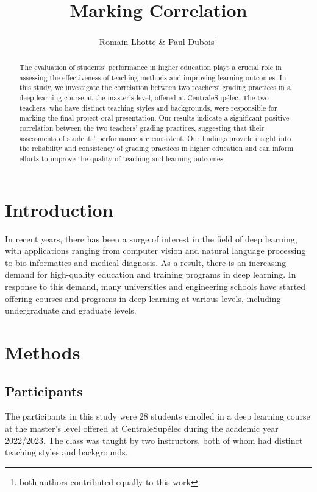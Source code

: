 \documentclass[a4paper]{article}
\title{Marking Correlation}
\author{Romain Lhotte \& Paul Dubois\footnote{both authors contributed equally to this work}}
\begin{document}
\maketitle

\begin{abstract}
	The evaluation of students' performance in higher education plays a crucial role in assessing the effectiveness of teaching methods and improving learning outcomes.
	In this study, we investigate the correlation between two teachers' grading practices in a deep learning course at the master's level, offered at CentraleSupélec.
	The two teachers, who have distinct teaching styles and backgrounds, were responsible for marking the final project oral presentation.
	Our results indicate a significant positive correlation between the two teachers' grading practices, suggesting that their assessments of students' performance are consistent.
	Our findings provide insight into the reliability and consistency of grading practices in higher education and can inform efforts to improve the quality of teaching and learning outcomes.
\end{abstract}

\section{Introduction}
In recent years, there has been a surge of interest in the field of deep learning, with applications ranging from computer vision and natural language processing to bio-informatics and medical diagnosis.
As a result, there is an increasing demand for high-quality education and training programs in deep learning.
In response to this demand, many universities and engineering schools have started offering courses and programs in deep learning at various levels, including undergraduate and graduate levels.


\section{Methods}
\subsection{Participants}
The participants in this study were 28 students enrolled in a deep learning course at the master's level offered at CentraleSupélec during the academic year 2022/2023.
The class was taught by two instructors, both of whom had distinct teaching styles and backgrounds.
\end{document}
